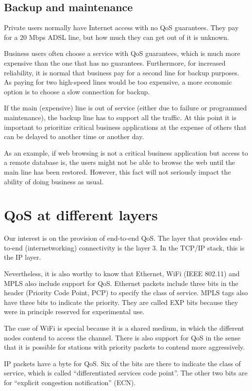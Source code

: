 \subsection{Backup and maintenance}

Private users normally have Internet access with no QoS guarantees.
They pay for a 20 Mbps ADSL line, but how much they can get out of it is unknown.

Business users often choose a service with QoS guarantees, which is much more expensive than the one that has no guarantees.
Furthermore, for increased reliability, it is normal that business pay for a second line for backup purposes.
As paying for two high-speed lines would be too expensive, a more economic option is to choose a slow connection for backup.

If the main (expensive) line is out of service (either due to failure or programmed maintenance), the backup line has to support all the traffic.
At this point it is important to prioritize critical business applications at the expense of others that can be delayed to another time or another day.

As an example, if web browsing is not a critical business application but access to a remote database is, the users might not be able to browse the web until the main line has been restored.
However, this fact will not seriously impact the ability of doing business as usual.


\section{QoS at different layers}
Our interest is on the provision of end-to-end QoS.
The layer that provides end-to-end (internetworking) connectivity is the layer 3.
In the TCP/IP stack, this is the IP layer.

Nevertheless, it is also worthy to know that Ethernet, WiFi (IEEE 802.11) and MPLS also include support for QoS.
Ethernet packets include three bits in the header (Priority Code Point, PCP) to specify the class of service.
MPLS tags also have three bits to indicate the priority. 
They are called EXP bits because they were in principle reserved for experimental use.

The case of WiFi is special because it is a shared medium, in which the different nodes contend to access the channel.
There is also support for QoS in the sense that it is possible for stations with priority packets to contend more aggressively.

IP packets have a byte for QoS.
Six of the bits are there to indicate the class of service, which is called ``differentiated services code point''.
The other two bits are for ``explicit congestion notification'' (ECN).

